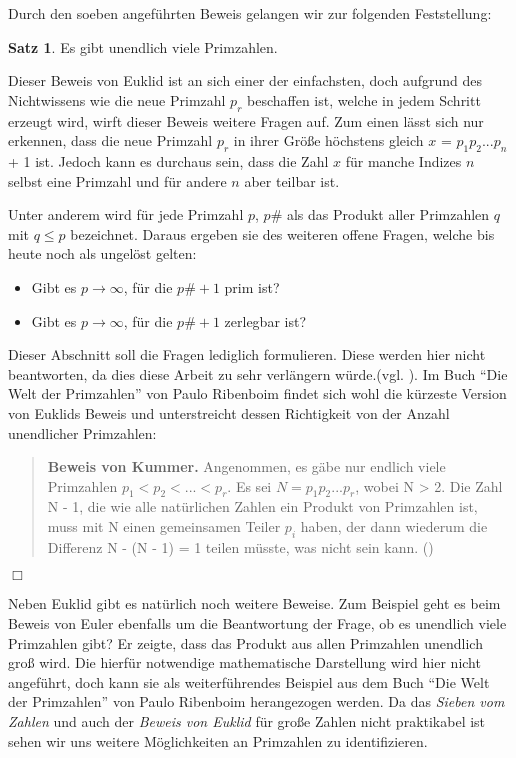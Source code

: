 \documentclass[12pt,a4paper]{article}
\theoremstyle{definition}
\newtheorem{satz}{Satz}[subsection]
\begin{document}
Durch den soeben angeführten Beweis gelangen wir zur folgenden Feststellung:
\begin{satz}Es gibt unendlich viele Primzahlen.\end{satz}

Dieser Beweis von Euklid ist an sich einer der einfachsten, doch aufgrund des Nichtwissens wie die neue Primzahl $p_r$ beschaffen ist, welche in jedem Schritt erzeugt wird, wirft dieser Beweis weitere Fragen auf.
Zum einen lässt sich nur erkennen, dass die neue Primzahl $p_r$ in ihrer Größe höchstens gleich\newline
$x$ = $p_1p_2...p_n$ + 1 ist. Jedoch kann es durchaus sein, dass die Zahl $x$ für manche Indizes $n$ selbst eine Primzahl und für andere $n$ aber teilbar ist.

Unter anderem wird für jede Primzahl $p$, $p\#$ als das Produkt aller Primzahlen $q$ mit $q \leq p$ bezeichnet. 
Daraus ergeben sie des weiteren offene Fragen, welche bis heute noch als ungelöst gelten:
\begin{itemize}
    \item Gibt es $p \to \infty$, für die $p\# +1$ prim ist?
    \item Gibt es $p \to \infty$, für die $p\# +1$ zerlegbar ist?
\end{itemize}
Dieser Abschnitt soll die Fragen lediglich formulieren.
Diese werden hier nicht beantworten, da dies diese Arbeit zu sehr verlängern würde.(vgl. \cite[4]{Ribenboim2006}).
Im Buch “Die Welt der Primzahlen” von Paulo Ribenboim findet sich wohl die kürzeste Version von Euklids Beweis und unterstreicht dessen Richtigkeit von der Anzahl unendlicher Primzahlen:

\begin{quote}
\small
\textbf{Beweis von Kummer.} Angenommen, es gäbe nur endlich viele Primzahlen $p_1 < p_2 <...< p_r$.
Es sei $N = p_1p_2...p_r$, wobei N > 2.
Die Zahl N - 1, die wie alle natürlichen Zahlen ein Produkt von Primzahlen ist, muss mit N einen gemeinsamen Teiler $p_i$ haben, der dann wiederum die Differenz N - (N - 1) = 1 teilen müsste, was nicht sein kann. (\cite[4]{Ribenboim2006})
\end{quote}
\begin{flushright}
$\Box$
\end{flushright}

Neben Euklid gibt es natürlich noch weitere Beweise.
Zum Beispiel geht es beim Beweis von Euler ebenfalls um die Beantwortung der Frage, ob es unendlich viele Primzahlen gibt?
Er zeigte, dass das Produkt aus allen Primzahlen unendlich groß wird.
Die hierfür notwendige mathematische Darstellung wird hier nicht angeführt, doch kann sie als weiterführendes Beispiel aus dem Buch “Die Welt der Primzahlen” von Paulo Ribenboim herangezogen werden.
Da das \textit{Sieben vom Zahlen} und auch der \textit{Beweis von Euklid} für große Zahlen nicht praktikabel ist sehen wir uns weitere Möglichkeiten an Primzahlen zu identifizieren.
\end{document}
